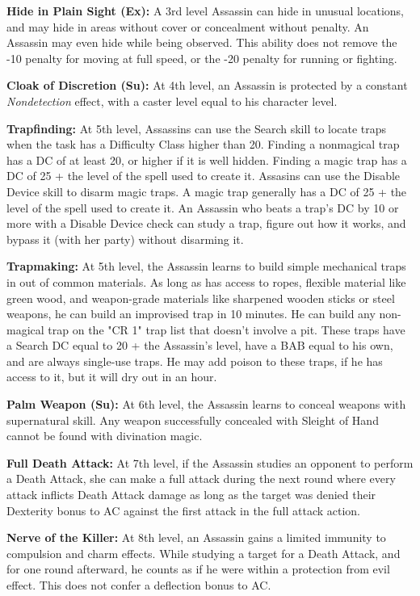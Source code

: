 \documentclass[10pt]{article}
\newcommand{\ability}[2]{\smallskip \noindent \textbf{#1} #2}
\begin{document}
\ability{Hide in Plain Sight (Ex):}{A 3rd level Assassin can hide in unusual locations, and may hide in areas without cover or concealment without penalty. An Assassin may even hide while being observed. This ability does not remove the -10 penalty for moving at full speed, or the -20 penalty for running or fighting.}

\ability{Cloak of Discretion (Su):}{At 4th level, an Assassin is protected by a constant \emph{Nondetection} effect, with a caster level equal to his character level.}

\ability{Trapfinding:}{At 5th level, Assassins can use the Search skill to locate traps when the task has a Difficulty Class higher than 20. Finding a nonmagical trap has a DC of at least 20, or higher if it is well hidden. Finding a magic trap has a DC of 25 + the level of the spell used to create it. Assasins can use the Disable Device skill to disarm magic traps. A magic trap generally has a DC of 25 + the level of the spell used to create it. An Assassin who beats a trap's DC by 10 or more with a Disable Device check can study a trap, figure out how it works, and bypass it (with her party) without disarming it.}

\ability{Trapmaking:}{At 5th level, the Assassin learns to build simple mechanical traps in out of common materials. As long as has access to ropes, flexible material like green wood, and weapon-grade materials like sharpened wooden sticks or steel weapons, he can build an improvised trap in 10 minutes. He can build any non-magical trap on the "CR 1" trap list that doesn't involve a pit. These traps have a Search DC equal to 20 + the Assassin's level, have a BAB equal to his own, and are always single-use traps. He may add poison to these traps, if he has access to it, but it will dry out in an hour.}

\ability{Palm Weapon (Su):}{At 6th level, the Assassin learns to conceal weapons with supernatural skill. Any weapon successfully concealed with Sleight of Hand cannot be found with divination magic.}

\ability{Full Death Attack:}{At 7th level, if the Assassin studies an opponent to perform a Death Attack, she can make a full attack during the next round where every attack inflicts Death Attack damage as long as the target was denied their Dexterity bonus to AC against the first attack in the full attack action.}

\ability{Nerve of the Killer:}{At 8th level, an Assassin gains a limited immunity to compulsion and charm effects. While studying a target for a Death Attack, and for one round afterward, he counts as if he were within a protection from evil effect. This does not confer a deflection bonus to AC.}
\end{document}
